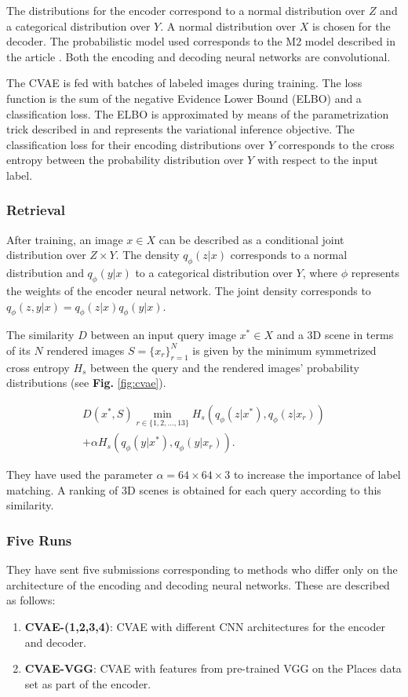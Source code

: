 \documentclass[../main.tex]{subfiles}
\begin{document}
The distributions for the encoder correspond to a normal distribution over $Z$ 
and a categorical distribution over $Y$. A normal distribution over $X$ is 
chosen for the decoder. The probabilistic model used corresponds to the M2 
model described in the article \cite{kingma2014semi}. Both the encoding and 
decoding neural networks are convolutional.

The CVAE is fed with batches of labeled images during training. The loss function is the sum of the negative Evidence Lower Bound (ELBO) and a classification loss. The ELBO is approximated by means of the parametrization trick described in \cite{kingma2014semi, kingma2013auto} and represents the variational inference objective. The classification loss for their encoding distributions over $Y$ corresponds to the cross entropy between the probability distribution over $Y$ with respect to the input label. 

\subsubsection{Retrieval}
After training, an image $x\in X$ can be described as a conditional joint 
distribution over $Z\times Y$. The density $q_\phi(z|x)$ corresponds to a 
normal distribution and $q_\phi(y|x)$ to a categorical distribution over $Y$, 
where $\phi$ represents the weights of the encoder neural network. The joint 
density corresponds to $q_\phi(z,y|x) = q_\phi(z|x) q_\phi(y|x)$.

The similarity $D$ between an input query image $x^*\in X$ and a 3D scene in 
terms of its $N$ rendered images $S = \{x_r\}_{r=1}^{N}$ is given by the 
minimum symmetrized cross entropy $H_s$ between the query and the rendered 
images' probability distributions (see \textbf{Fig.} \ref{fig:cvae}).

\begin{multline}
 D(x^*, S)\min_{r\in\{1,2,\ldots,13\} }H_s(q_\phi(z|x^*),q_\phi(z|x_{r}))\\
+\alpha H_s(q_\phi(y|x^*),q_\phi(y|x_{r})).
\end{multline}

They have used the parameter $\alpha = 64\times 64 \times 3$ to increase the importance of label matching. A ranking of 3D scenes is obtained for each query according to this similarity.

\subsubsection{Five Runs}
They have sent five submissions corresponding to methods who differ only on the architecture of the encoding and decoding neural networks. These are described as follows:
\begin{enumerate}
    \item \textbf{CVAE-(1,2,3,4)}: CVAE with different CNN architectures for the encoder and decoder.
    \item \textbf{CVAE-VGG}: CVAE with features from pre-trained VGG \cite{gkallia2017keras_places365} on the Places data set \cite{Places88} as part of the encoder.
    
\end{enumerate}
\end{document}

